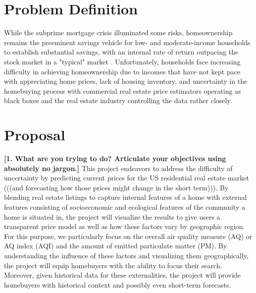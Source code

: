 \documentclass[sigconf,nonacm,11pt]{acmart}
\begin{document}
\section{Problem Definition}
While the subprime mortgage crisis illuminated some risks, homeownership remains the preeminent savings vehicle for low- and moderate-income households to establish substantial savings, with an internal rate of return outpacing the stock market in a "typical" market \cite{Goodman2018}. Unfortunately, households face increasing difficulty in achieving homeownership due to incomes that have not kept pace with appreciating home prices, lack of housing inventory, and uncertainty in the homebuying process with commercial real estate price estimators operating as black boxes and the real estate industry controlling the data rather closely.

\section{Proposal}

\textbf{[1. What are you trying to do? Articulate your objectives using absolutely no jargon.]}
This project endeavors to address the difficulty of uncertainty by predicting current prices for the US residential real estate market (((and forecasting how those prices might change in the short term))). By blending real estate listings to capture internal features of a home with external features consisting of socioeconomic and ecological features of the community a home is situated in, the project will visualize the results to give users a transparent price model as well as how these factors vary by geographic region. For this purpose, we particularly focus on the overall air quality measure (AQ) or AQ index (AQI) and the amount of emitted particulate matter (PM). By understanding the influence of these factors and visualizing them geographically, the project will equip homebuyers with the ability to focus their search. Moreover, given historical data for these externalities, the project will provide homebuyers with historical context and possibly even short-term forecasts.
\end{document}
